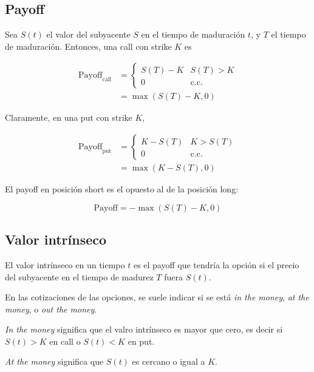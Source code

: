 \documentclass[a4paper, 12pt]{article}
\theoremstyle{definition}
\begin{document}
\subsection{Payoff}

Sea $S(t)$ el valor del subyacente $S$ en el tiempo de maduración $t$, y $T$ el
tiempo de maduración. Entonces, una call con strike $K$ es

\begin{align*}
    \text{Payoff}_{\text{call}} &= \begin{cases}
        S(T) - K & S(T) > K \\ 
        0 & \text{c.c.}
    \end{cases} \\ 
                  &= \max \left( S(T) - K, 0 \right) 
\end{align*}

Claramente, en una put con strike $K$,


\begin{align*}
    \text{Payoff}_{\text{put}} &= \begin{cases}
        K - S(T) & K > S(T) \\ 
        0 & \text{c.c.}
    \end{cases} \\ 
                  &= \max \left( K - S(T), 0 \right) 
\end{align*}

El payoff en posición short es el opuesto al de la posición long: 

\begin{equation*}
    \text{Payoff} = - \max \left( S(T) - K, 0 \right) 
\end{equation*}

\subsection{Valor intrínseco}

El valor intrínseco en un tiempo $t$ es el payoff que tendría la opción si el
precio del subyacente en el tiempo de madurez $T$ fuera $S(t)$. 

En las cotizaciones de las opciones, se suele indicar si se está \textit{in the
money}, \textit{at the money}, o \textit{out the money}. 

\textit{In the money}
significa que el valro intrínseco es mayor que cero, es decir si $S(t) > K$ en
call o $S(t) < K$ en put. 

\textit{At the money} significa que $S(t)$ es cercano o igual a $K$.
\end{document}
